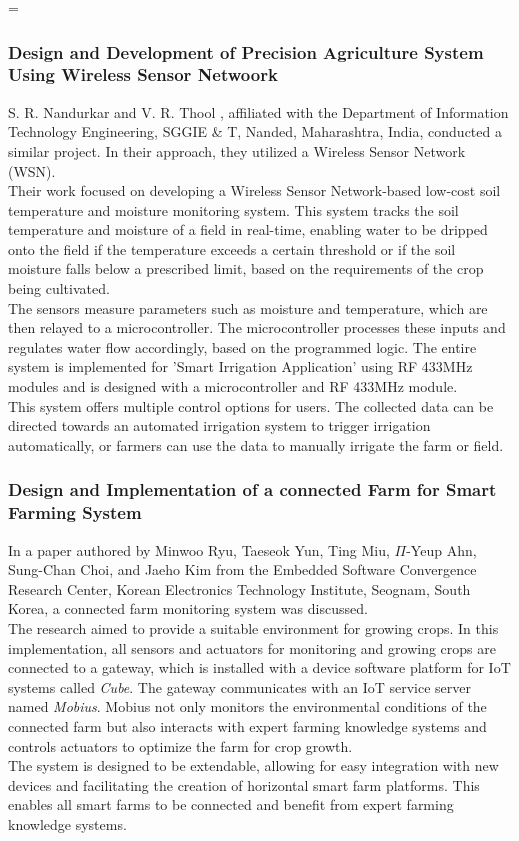 =\documentclass[12pt, a4paper]{article}
\begin{document}
\subsubsection{Design and Development of Precision Agriculture System Using Wireless Sensor Netwoork}
S. R. Nandurkar and V. R. Thool \cite{6808017}, affiliated with the Department of Information Technology Engineering, SGGIE & T, Nanded, Maharashtra, India, conducted a similar project. In their approach, they utilized a Wireless Sensor Network (WSN).\\
Their work focused on developing a Wireless Sensor Network-based low-cost soil temperature and moisture monitoring system. This system tracks the soil temperature and moisture of a field in real-time, enabling water to be dripped onto the field if the temperature exceeds a certain threshold or if the soil moisture falls below a prescribed limit, based on the requirements of the crop being cultivated.\\
The sensors measure parameters such as moisture and temperature, which are then relayed to a microcontroller. The microcontroller processes these inputs and regulates water flow accordingly, based on the programmed logic. The entire system is implemented for 'Smart Irrigation Application' using RF 433MHz modules and is designed with a microcontroller and RF 433MHz module.\\
This system offers multiple control options for users. The collected data can be directed towards an automated irrigation system to trigger irrigation automatically, or farmers can use the data to manually irrigate the farm or field.

\subsubsection{Design and Implementation of a connected Farm for Smart Farming System}
In a paper authored by Minwoo Ryu, Taeseok Yun, Ting Miu, $\Pi$-Yeup Ahn, Sung-Chan Choi, and Jaeho Kim \cite{7370624} from the Embedded Software Convergence Research Center, Korean Electronics Technology Institute, Seognam, South Korea, a connected farm monitoring system was discussed.\\
The research aimed to provide a suitable environment for growing crops. In this implementation, all sensors and actuators for monitoring and growing crops are connected to a gateway, which is installed with a device software platform for IoT systems called \emph{Cube}. The gateway communicates with an IoT service server named \emph{Mobius}. Mobius not only monitors the environmental conditions of the connected farm but also interacts with expert farming knowledge systems and controls actuators to optimize the farm for crop growth.\\
The system is designed to be extendable, allowing for easy integration with new devices and facilitating the creation of horizontal smart farm platforms. This enables all smart farms to be connected and benefit from expert farming knowledge systems.    
  
\end{document}
